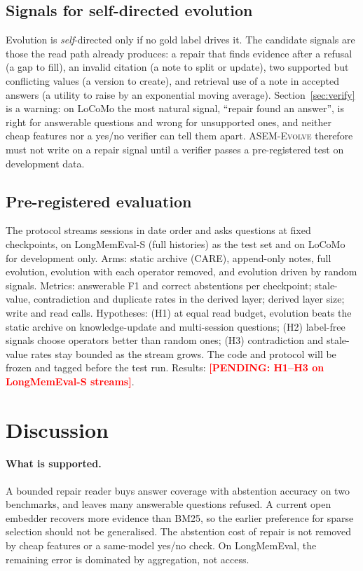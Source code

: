 \documentclass[11pt]{article}
\newcommand{\care}{\textsc{CARE}}
\newcommand{\evolve}{\textsc{ASEM-Evolve}}
\newcommand{\pending}[1]{\textcolor{red}{\textbf{[PENDING: #1]}}}
\begin{document}
\subsection{Signals for self-directed evolution}

Evolution is \emph{self}-directed only if no gold label drives it. The
candidate signals are those the read path already produces: a repair that finds
evidence after a refusal (a gap to fill), an invalid citation (a note to split
or update), two supported but conflicting values (a version to create), and
retrieval use of a note in accepted answers (a utility to raise by an
exponential moving average). Section~\ref{sec:verify} is a warning: on LoCoMo
the most natural signal, ``repair found an answer'', is right for answerable
questions and wrong for unsupported ones, and neither cheap features nor a
yes/no verifier can tell them apart. \evolve{} therefore must not write on a
repair signal until a verifier passes a pre-registered test on development data.

\subsection{Pre-registered evaluation}

The protocol streams sessions in date order and asks questions at fixed
checkpoints, on LongMemEval-S (full histories) as the test set and on LoCoMo
for development only. Arms: static archive (\care{}), append-only notes, full
evolution, evolution with each operator removed, and evolution driven by random
signals. Metrics: answerable F1 and correct abstentions per checkpoint;
stale-value, contradiction and duplicate rates in the derived layer; derived
layer size; write and read calls. Hypotheses: (H1) at equal read budget,
evolution beats the static archive on knowledge-update and multi-session
questions; (H2) label-free signals choose operators better than random ones;
(H3) contradiction and stale-value rates stay bounded as the stream grows. The
code and protocol will be frozen and tagged before the test run.
Results: \pending{H1--H3 on LongMemEval-S streams}.

\section{Discussion}
\label{sec:discussion}

\paragraph{What is supported.}
A bounded repair reader buys answer coverage with abstention accuracy on two
benchmarks, and leaves many answerable questions refused. A current open
embedder recovers more evidence than BM25, so the earlier preference for sparse
selection should not be generalised. The abstention cost of repair is not
removed by cheap features or a same-model yes/no check. On LongMemEval, the
remaining error is dominated by aggregation, not access.
\end{document}
